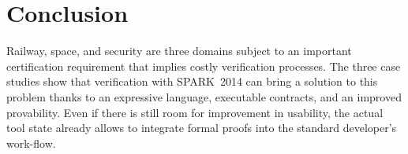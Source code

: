 \documentclass[10pt,a4paper,twocolumn]{article}
\newcommand{\newspark}{SPARK~2014\xspace}
\begin{document}
\section{Conclusion}

Railway, space, and security are three domains subject to an important
certification requirement that implies costly verification processes. The three
case studies show that verification with \newspark can bring a solution to this
problem thanks to an expressive language, executable contracts, and
an improved provability. Even if there is still room for improvement in
usability, the actual tool state already allows to integrate formal proofs into
the standard developer's work-flow.




\end{document}
